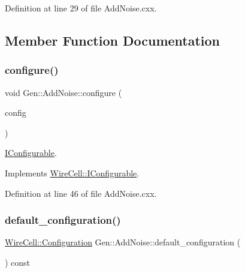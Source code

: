 Definition at line 29 of file Add\+Noise.\+cxx.



\subsection{Member Function Documentation}
\mbox{\label{class_wire_cell_1_1_gen_1_1_add_noise_a4df7ec3fb71fa5dd60b634f3e6d093b1}} 
\subsubsection{\texorpdfstring{configure()}{configure()}}
{\footnotesize\ttfamily void Gen\+::\+Add\+Noise\+::configure (\begin{DoxyParamCaption}\item[{const \hyperlink{namespace_wire_cell_a9f705541fc1d46c608b3d32c182333ee}{Wire\+Cell\+::\+Configuration} \&}]{config }\end{DoxyParamCaption})\hspace{0.3cm}{\ttfamily [virtual]}}



\hyperlink{class_wire_cell_1_1_i_configurable}{I\+Configurable}. 



Implements \hyperlink{class_wire_cell_1_1_i_configurable_a57ff687923a724093df3de59c6ff237d}{Wire\+Cell\+::\+I\+Configurable}.



Definition at line 46 of file Add\+Noise.\+cxx.

\mbox{\label{class_wire_cell_1_1_gen_1_1_add_noise_ad576034249779d453b9472216dd0e1ee}} 
\subsubsection{\texorpdfstring{default\+\_\+configuration()}{default\_configuration()}}
{\footnotesize\ttfamily \hyperlink{namespace_wire_cell_a9f705541fc1d46c608b3d32c182333ee}{Wire\+Cell\+::\+Configuration} Gen\+::\+Add\+Noise\+::default\+\_\+configuration (\begin{DoxyParamCaption}{ }\end{DoxyParamCaption}) const\hspace{0.3cm}{\ttfamily [virtual]}}



